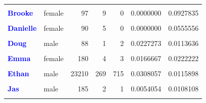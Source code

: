 \documentclass[
  man]{apa6}
\begin{document}
\begin{table}[!h]
\begin{tabular}[t]{>{}llrrrrr}
\textcolor{blue}{\textbf{\cellcolor{gray!10}{Brian}}} & \cellcolor{gray!10}{male} & \cellcolor{gray!10}{89} & \cellcolor{gray!10}{1} & \cellcolor{gray!10}{0} & \cellcolor{gray!10}{0.0000000} & \cellcolor{gray!10}{0.0112360}\\
\textcolor{blue}{\textbf{Brooke}} & female & 97 & 9 & 0 & 0.0000000 & 0.0927835\\
\addlinespace
\textcolor{blue}{\textbf{\cellcolor{gray!10}{Carol}}} & \cellcolor{gray!10}{female} & \cellcolor{gray!10}{83} & \cellcolor{gray!10}{12} & \cellcolor{gray!10}{0} & \cellcolor{gray!10}{0.0000000} & \cellcolor{gray!10}{0.1445783}\\
\textcolor{blue}{\textbf{Danielle}} & female & 90 & 5 & 0 & 0.0000000 & 0.0555556\\
\textcolor{blue}{\textbf{\cellcolor{gray!10}{David}}} & \cellcolor{gray!10}{male} & \cellcolor{gray!10}{688} & \cellcolor{gray!10}{75} & \cellcolor{gray!10}{24} & \cellcolor{gray!10}{0.0348837} & \cellcolor{gray!10}{0.1090116}\\
\textcolor{blue}{\textbf{Doug}} & male & 88 & 1 & 2 & 0.0227273 & 0.0113636\\
\textcolor{blue}{\textbf{\cellcolor{gray!10}{Emily}}} & \cellcolor{gray!10}{female} & \cellcolor{gray!10}{142} & \cellcolor{gray!10}{2} & \cellcolor{gray!10}{0} & \cellcolor{gray!10}{0.0000000} & \cellcolor{gray!10}{0.0140845}\\
\addlinespace
\textcolor{blue}{\textbf{Emma}} & female & 180 & 4 & 3 & 0.0166667 & 0.0222222\\
\textcolor{blue}{\textbf{\cellcolor{gray!10}{Erica}}} & \cellcolor{gray!10}{female} & \cellcolor{gray!10}{123} & \cellcolor{gray!10}{3} & \cellcolor{gray!10}{0} & \cellcolor{gray!10}{0.0000000} & \cellcolor{gray!10}{0.0243902}\\
\textcolor{blue}{\textbf{Ethan}} & male & 23210 & 269 & 715 & 0.0308057 & 0.0115898\\
\textcolor{blue}{\textbf{\cellcolor{gray!10}{Jarret}}} & \cellcolor{gray!10}{male} & \cellcolor{gray!10}{99} & \cellcolor{gray!10}{0} & \cellcolor{gray!10}{1} & \cellcolor{gray!10}{0.0101010} & \cellcolor{gray!10}{0.0000000}\\
\textcolor{blue}{\textbf{Jas}} & male & 185 & 2 & 1 & 0.0054054 & 0.0108108\\
\addlinespace
\textcolor{blue}{\textbf{\cellcolor{gray!10}{Jase}}} & \cellcolor{gray!10}{male} & \cellcolor{gray!10}{1777} & \cellcolor{gray!10}{88} & \cellcolor{gray!10}{71} & \cellcolor{gray!10}{0.0399550} & \cellcolor{gray!10}{0.0495217}\\

\end{tabular}
\end{table}
\end{document}
